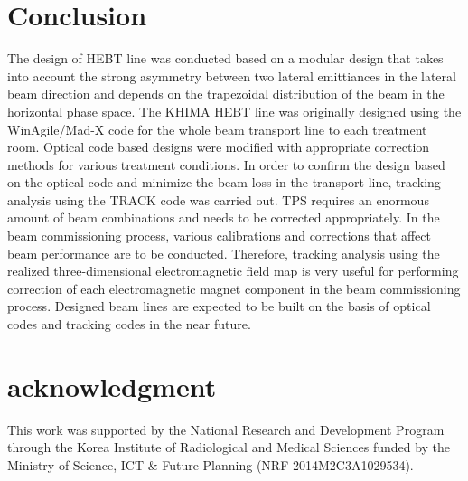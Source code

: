 \documentclass[jkps,preprint,fleqn,showpacs,showkeys,10pt,twocolumn]{revtex4}
\begin{document}
\section{Conclusion}
\label{sec:Con}
The design of HEBT line was conducted based on a modular design that takes into account the strong asymmetry
between two lateral emittiances in the lateral beam direction and depends on the trapezoidal distribution of the beam in the horizontal phase space.
The KHIMA HEBT line was originally designed using the WinAgile/Mad-X code for the whole beam transport line to each treatment room.
Optical code based designs were modified with appropriate correction methods for various treatment conditions. 
In order to confirm the design based on the optical code and minimize the beam loss in the transport line,
tracking analysis using the TRACK code was carried out.
TPS requires an enormous amount of beam combinations and needs to be corrected appropriately.
In the beam commissioning process, various calibrations and corrections that affect beam performance are to be conducted.
Therefore, tracking analysis using the realized three-dimensional electromagnetic field map is very useful
for performing correction of each electromagnetic magnet component in the beam commissioning process.
Designed beam lines are expected to be built on the basis of optical codes and tracking codes in the near future.
\section{acknowledgment}
This work was supported by the National Research and Development Program through the Korea Institute of Radiological and Medical Sciences
funded by the Ministry of Science, ICT \& Future Planning (NRF-2014M2C3A1029534).
\end{document}
